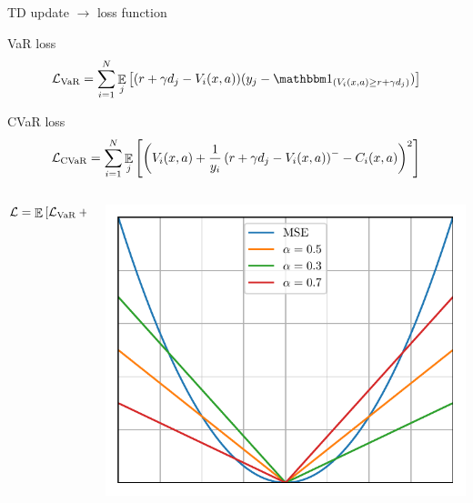 \documentclass{beamer}
\begin{document}
\begin{frame}{TD update $\to$ loss function}
\begin{block}{VaR loss}
$$\mathcal{L}_{\var}=\sum_{i=1}^{N} \expect_j\bsquare{(r + \gamma d_j - V_i(x, a))(y_j - \indicator_{(V_i(x, a) \ge r + \gamma d_j)})}$$
\end{block}

\begin{block}{CVaR loss}
\vspace{-0.5cm}
$$
\mathcal{L}_{\text{CVaR}}=\sum_{i=1}^{N} \mathop{\mathbb{E}}_j\left[ {\left( {V_i(x, a) + \frac{1}{y_i} \left( {r + \gamma d_j - V_i(x, a)} \right)^- - C_i(x, a)} \right)^2} \right]
$$
\end{block}
\vspace{-0.3cm}

\begin{columns}
\begin{column}{0.5\textwidth}
$$\mathcal{L} = \mathop{\mathbb{E}}\left[\mathcal{L}_{\text{VaR}} + \mathcal{L}_{\text{CVaR}} \right]$$
\end{column}
\begin{column}{0.5\textwidth}
\center
\includegraphics[width=0.6\linewidth]{../gfx/losses.pdf}
\end{column}
\end{columns}

\end{frame}

\end{document}
